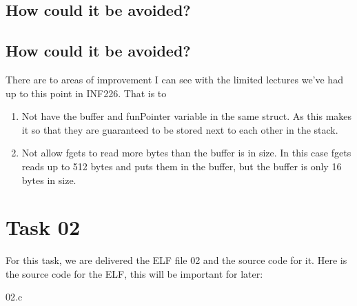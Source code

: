 \documentclass{article}
\begin{document}
\subsection{How could it be avoided?}
\subsection{How could it be avoided?}
There are to areas of improvement I can see with the limited lectures we've had up to this point in INF226. That is to \begin{enumerate}
    \item Not have the buffer and funPointer variable in the same struct. As this makes it so that they are guaranteed to be stored next to each other in the stack.
    \item Not allow fgets to read more bytes than the buffer is in size. In this case fgets reads up to 512 bytes and puts them in the buffer, but the buffer is only 16 bytes in size.
\end{enumerate}


\section{Task 02}
For this task, we are delivered the ELF file 02 and the source code for it.
Here is the source code for the ELF, this will be important for later:

{02.c}
\end{document}
